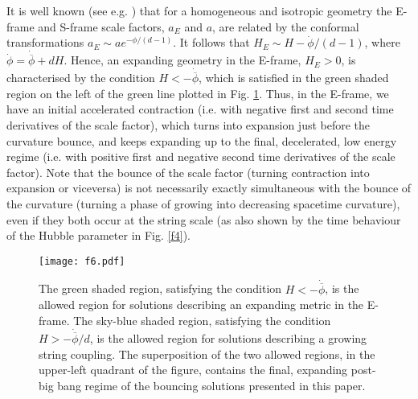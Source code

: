 \documentclass[a4paper,11pt]{article}
\def \fp {{\dot{\phi}}}
\def \fb {\overline \phi}
\def \fbp {\dot{\fb}}
\begin{document}
It is well known (see e.g. \cite{9}) that for a homogeneous and isotropic geometry the E-frame and S-frame scale factors, $a_E$ and $a$, are related by the conformal transformations $a_E \sim a e^{-\phi/(d-1)}$. It follows that $H_E \sim H - \fp/(d-1)$, where $\fp= \fbp +dH$. Hence, an expanding geometry in the E-frame, $H_E>0$, is characterised by the condition $H<-\fbp$, which is satisfied in the green shaded region on the left of the green line plotted in Fig. \ref{f6}. Thus, in the E-frame, we have an initial accelerated contraction (i.e. with negative first and second time derivatives of the scale factor), which turns  into expansion just before the curvature bounce, and keeps expanding up to the final, decelerated, low energy regime (i.e. with positive first and negative second time derivatives of the scale factor). Note that the bounce of the scale factor (turning contraction into expansion or viceversa) is not necessarily exactly simultaneous with the bounce of the  curvature (turning a phase of growing into decreasing spacetime curvature), even if they both occur at the string scale (as also shown by the time behaviour of the Hubble parameter in Fig. \ref{f4}).

\begin{figure}[t]
\centering
\texttt{[image: f6.pdf]}
\caption{The green shaded region, satisfying the condition $H<-\fbp$, is the allowed region for solutions describing an expanding metric in the E-frame. 
The sky-blue shaded region, satisfying the condition $H>-\fbp/d$, is the allowed region for solutions describing a growing string coupling. The superposition of the two allowed regions, in the upper-left quadrant of the figure, contains the final, expanding post-big bang regime of the bouncing solutions presented in this paper.}
\label{f6}
\end{figure}
\end{document}
